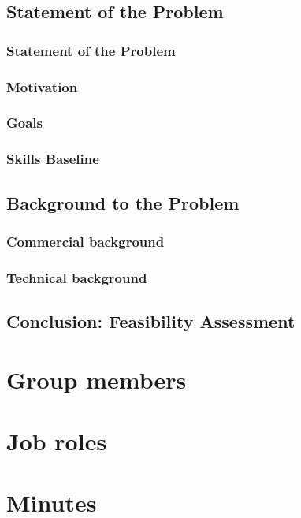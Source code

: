 \def\thedocument{Project Planning Document}
\def\thedate{DATE} %
\def\theversion{0.1}
\def\thestatus{Working copy}





\section{Statement of the Problem}
	\subsection{Statement of the Problem}
		
	\subsection{Motivation}
		
	\subsection{Goals}
		
	\subsection{Skills Baseline}
		
\section{Background to the Problem}
	\subsection{Commercial background}
		
	\subsection{Technical background}
		
\section{Conclusion: Feasibility Assessment}
	
\appendix

\chapter{Group members}
	

\chapter{Job roles}
	

\chapter{Minutes}
	



